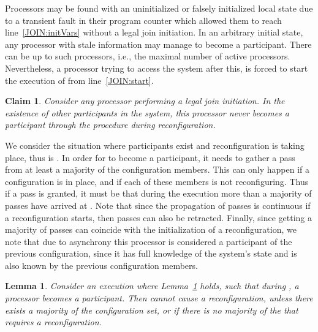 \documentclass[11pt]{article}
\newtheorem{lemma}[theorem]{Lemma}
\newtheorem{claim}[theorem]{Claim}
\newenvironment{proof}{\noindent{\bf Proof.}}{\hfill}
\begin{document}
\begin{proof}
Processors may be found with an uninitialized or falsely initialized local state due to a transient fault in their program counter which allowed them to reach line~\ref{JOIN:initVars} without a legal join initiation.
In an arbitrary initial state, any processor with stale information may manage to become a participant.
There can be up to  such processors, i.e., the maximal number of active processors.
Nevertheless, a processor trying to access the system after this, is forced to start the execution of  from line~\ref{JOIN:start}.


\end{proof}


\begin{claim}
\label{thJ:noReconfJoin}
Consider any processor  performing a legal join initiation. 
In the existence of other participants in the system, this processor never becomes a participant through the  procedure during reconfiguration.
\end{claim}

\begin{proof}
We consider the situation where participants exist and reconfiguration is taking place, thus  is .
In order for  to become a participant, it needs to gather a pass from at least a majority of the configuration members.
This can only happen if a configuration is in place, and if each of these members is not reconfiguring.
Thus if a pass is granted, it must be that during the execution more than a majority of  passes have arrived at .
Note that since the propagation of passes is continuous if a reconfiguration starts, then passes can also be retracted.
Finally, since getting a majority of passes can coincide with the initialization of a reconfiguration, we note that due to asynchrony this processor is considered a participant of the previous configuration, since it has full knowledge of the system's state and is also known by the previous configuration members.
\end{proof}



\begin{lemma}
\label{thQ:noReconfByJoiner}
Consider an execution  where Lemma~\ref{thJ:noReconfJoin} holds, such that during , a processor  becomes a participant. 
Then  cannot cause a reconfiguration, unless there exists a majority of the configuration set, or if there is no majority of the  that requires a reconfiguration.
\end{lemma}
\end{document}
